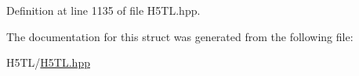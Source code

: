 Definition at line 1135 of file H5\-T\-L.\-hpp.



The documentation for this struct was generated from the following file\-:\begin{DoxyCompactItemize}
\item 
H5\-T\-L/\hyperlink{_h5_t_l_8hpp}{H5\-T\-L.\-hpp}\end{DoxyCompactItemize}
